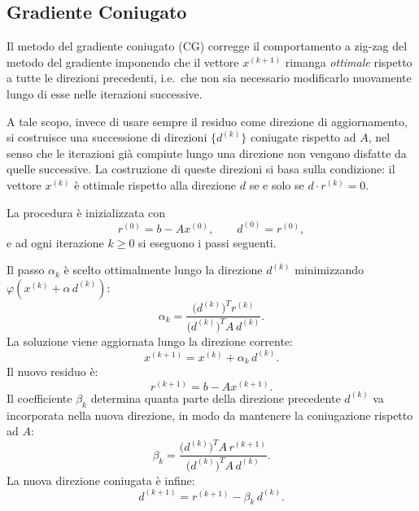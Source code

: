 \documentclass[a4paper,12pt]{article}
\begin{document}
\subsection{Gradiente Coniugato}
 
Il metodo del gradiente coniugato (CG) corregge il comportamento a zig-zag
del metodo del gradiente imponendo che il vettore $x^{(k+1)}$ rimanga
\emph{ottimale} rispetto a tutte le direzioni precedenti, i.e.\ che non sia
necessario modificarlo nuovamente lungo di esse nelle iterazioni successive.
 
A tale scopo, invece di usare sempre il residuo come direzione di
aggiornamento, si costruisce una successione di direzioni $\{d^{(k)}\}$
coniugate rispetto ad $A$, nel senso che le iterazioni già compiute lungo
una direzione non vengono disfatte da quelle successive. La costruzione di
queste direzioni si basa sulla condizione: il
vettore $x^{(k)}$ è ottimale rispetto alla direzione $d$ se e solo se
$d \cdot r^{(k)} = 0$.
 
La procedura è inizializzata con
\begin{equation}
    r^{(0)} = b - Ax^{(0)}, \qquad d^{(0)} = r^{(0)},
\end{equation}
e ad ogni iterazione $k \geq 0$ si eseguono i passi seguenti.
 
Il passo $\alpha_k$ è scelto ottimalmente lungo la direzione $d^{(k)}$
minimizzando $\varphi(x^{(k)} + \alpha\, d^{(k)})$:
\begin{equation}
    \alpha_k = \frac{\bigl(d^{(k)}\bigr)^T r^{(k)}}
                    {\bigl(d^{(k)}\bigr)^T A\, d^{(k)}}.
\end{equation}
La soluzione viene aggiornata lungo la direzione corrente:
\begin{equation}
    x^{(k+1)} = x^{(k)} + \alpha_k\, d^{(k)}.
\end{equation}
Il nuovo residuo è:
\begin{equation}
    r^{(k+1)} = b - Ax^{(k+1)}.
\end{equation}
Il coefficiente $\beta_k$ determina quanta parte della direzione precedente
$d^{(k)}$ va incorporata nella nuova direzione, in modo da mantenere la
coniugazione rispetto ad $A$:
\begin{equation}
    \beta_k = \frac{\bigl(d^{(k)}\bigr)^T A\, r^{(k+1)}}
                   {\bigl(d^{(k)}\bigr)^T A\, d^{(k)}}.
\end{equation}
La nuova direzione coniugata è infine:
\begin{equation}
    d^{(k+1)} = r^{(k+1)} - \beta_k\, d^{(k)}.
\end{equation}
\end{document}
